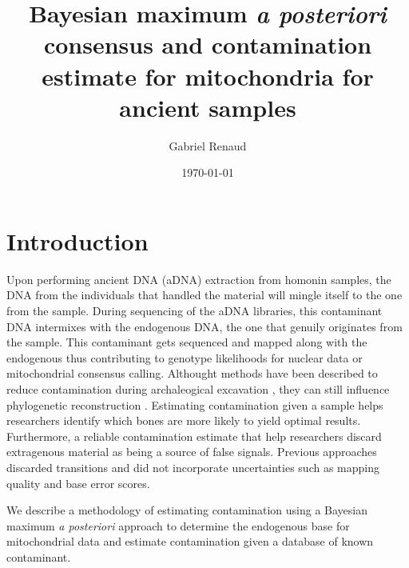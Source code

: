 \documentclass[a4paper,12pt]{article}
\begin{document}


\title{Bayesian maximum {\it a posteriori} consensus and contamination estimate for mitochondria for ancient samples }
\date{\today}
\author{Gabriel Renaud}


\maketitle

\section{Introduction}

Upon performing ancient DNA (aDNA) extraction from homonin samples, the DNA from the individuals that handled the material will mingle itself to the one from the sample. During sequencing of the aDNA libraries, this contaminant DNA intermixes with the endogenous DNA, the one that genuily originates from the sample. This contaminant gets sequenced and mapped along with the endogenous thus contributing to genotype likelihoods for nuclear data or mitochondrial consensus calling. Althought methods have been described to reduce contamination during archaleogical excavation \cite{yang2005contamination}, they can still influence phylogenetic reconstruction \cite{wall2007inconsistencies}. Estimating contamination given a sample helps researchers identify which bones are more likely to yield optimal results. Furthermore, a reliable contamination estimate that help researchers discard extragenous material as being a source of false signals. Previous approaches discarded transitions and did not incorporate uncertainties such as mapping quality and base error scores.

We describe a methodology of estimating contamination using a Bayesian maximum {\it a posteriori} approach to determine the endogenous base for mitochondrial data and estimate contamination given a database of known contaminant.  
\end{document}
